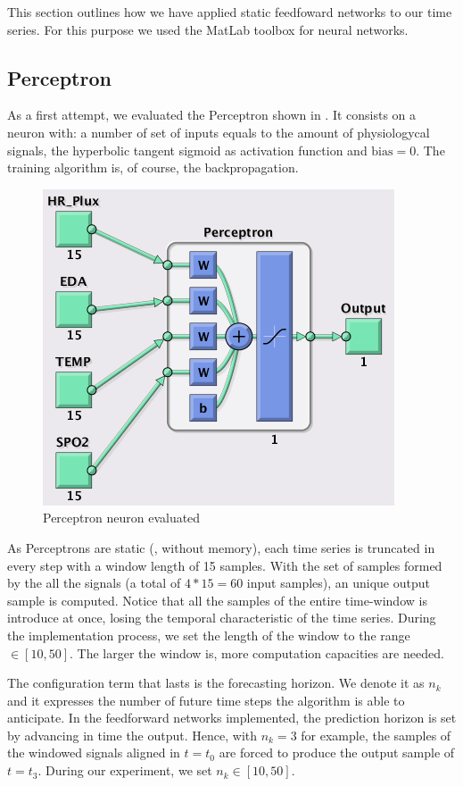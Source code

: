 \label{sec:application:feedforward}

This section outlines how we have applied static feedfoward networks to our time series. For this purpose we used the MatLab toolbox for neural networks.

\subsection{Perceptron}
\label{subsec:perceptronapplication}

As a first attempt, we evaluated the Perceptron shown in . 
It consists on a neuron with:
a number of set of inputs equals to the amount of physiologycal signals,
the hyperbolic tangent sigmoid as activation function
and $\text{bias}=0$. The training algorithm is, of course, the backpropagation.
\begin{figure}[!ht]
\centering
\includegraphics[width=0.5\columnwidth]{images/results/perceptronnn}
\caption{Perceptron neuron evaluated}
\label{fig:perceptronbuildt}
\end{figure}

As Perceptrons are static (\ie, without memory), each time series is truncated in every step with a window length of 15 samples. 
With the set of samples formed by the all the signals (a total of $4*15=60$ input samples), an unique output sample is computed. Notice that all the samples of the entire time-window is introduce at once, losing the temporal characteristic of the time series. During the implementation process, we set the length of the window to the range $\in [10,50]$. The larger the window is, more computation capacities are needed.

The configuration term that lasts is the forecasting horizon. We denote it as $n_{k}$ and it expresses the number of future time steps the algorithm is able to anticipate.
In the feedforward networks implemented, the prediction horizon is set by advancing in time the output. 
Hence, with $n_{k}=3$ for example, the samples of the windowed signals aligned in $t=t_{0}$ are forced to produce the output sample of $t=t_{3}$.
During our experiment, we set $n_{k}\in [10,50]$. 

